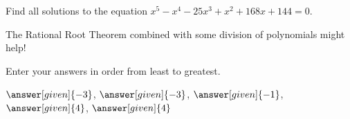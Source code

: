 \documentclass[nooutcomes]{ximera}
\begin{document}
\begin{problem}
Find all solutions to the equation $x^5-x^4-25x^3+x^2+168x+144=0$. 
\begin{hint} 
The Rational Root Theorem combined with some division of polynomials might help!
\end{hint}
Enter your answers in order from least to greatest.

\begin{prompt}
$\answer[given]{-3}$, $\answer[given]{-3}$, $\answer[given]{-1}$, $\answer[given]{4}$, $\answer[given]{4}$
\end{prompt}
\end{problem}
\end{document}
